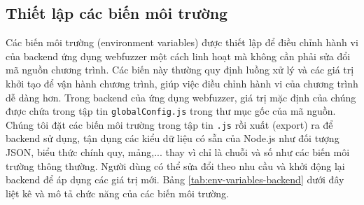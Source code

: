 \subsection{Thiết lập các biến môi trường}
Các biến môi trường (environment variables) được thiết lập để điều chỉnh hành vi của backend ứng dụng webfuzzer một cách linh hoạt mà không cần phải sửa đổi mã nguồn chương trình. Các biến này thường quy định luồng xử lý và các giá trị khởi tạo để vận hành chương trình, giúp việc điều chỉnh hành vi của chương trình dễ dàng hơn. Trong backend của ứng dụng webfuzzer, giá trị mặc định của chúng được chứa trong tập tin \texttt{globalConfig.js} trong thư mục gốc của mã nguồn. Chúng tôi đặt các biến môi trường trong tập tin \texttt{.js} rồi xuất (export) ra để backend sử dụng, tận dụng các kiểu dữ liệu có sẵn của Node.js như đối tượng JSON, biểu thức chính quy, mảng,... thay vì chỉ là chuỗi và số như các biến môi trường thông thường. Người dùng có thể sửa đổi theo nhu cầu và khởi động lại backend để áp dụng các giá trị mới. Bảng \ref{tab:env-variables-backend} dưới đây liệt kê và mô tả chức năng của các biến môi trường.
\FloatBarrier
